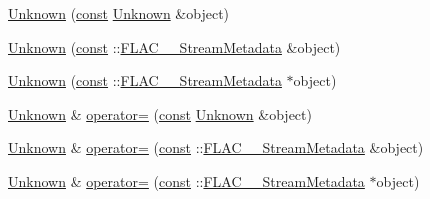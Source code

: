{\bf }\par
\begin{DoxyCompactItemize}
\item 
\hyperlink{class_f_l_a_c_1_1_metadata_1_1_unknown_a686a799c353cf7a3dc95bb8899318a6b}{Unknown} (\hyperlink{getopt1_8c_a2c212835823e3c54a8ab6d95c652660e}{const} \hyperlink{class_f_l_a_c_1_1_metadata_1_1_unknown}{Unknown} \&object)
\item 
\hyperlink{class_f_l_a_c_1_1_metadata_1_1_unknown_ad3e590e4c78eeda42021fe88b85bdf91}{Unknown} (\hyperlink{getopt1_8c_a2c212835823e3c54a8ab6d95c652660e}{const} \+::\hyperlink{struct_f_l_a_c_____stream_metadata}{F\+L\+A\+C\+\_\+\+\_\+\+Stream\+Metadata} \&object)
\item 
\hyperlink{class_f_l_a_c_1_1_metadata_1_1_unknown_a320c150b6c1c9b1386390eef1c581172}{Unknown} (\hyperlink{getopt1_8c_a2c212835823e3c54a8ab6d95c652660e}{const} \+::\hyperlink{struct_f_l_a_c_____stream_metadata}{F\+L\+A\+C\+\_\+\+\_\+\+Stream\+Metadata} $\ast$object)
\end{DoxyCompactItemize}

{\bf }\par
\begin{DoxyCompactItemize}
\item 
\hyperlink{class_f_l_a_c_1_1_metadata_1_1_unknown}{Unknown} \& \hyperlink{class_f_l_a_c_1_1_metadata_1_1_unknown_a295f824df8ed10c3386df72272fdca47}{operator=} (\hyperlink{getopt1_8c_a2c212835823e3c54a8ab6d95c652660e}{const} \hyperlink{class_f_l_a_c_1_1_metadata_1_1_unknown}{Unknown} \&object)
\item 
\hyperlink{class_f_l_a_c_1_1_metadata_1_1_unknown}{Unknown} \& \hyperlink{class_f_l_a_c_1_1_metadata_1_1_unknown_a5b51e8afe12e5359386d7a85ac330d6e}{operator=} (\hyperlink{getopt1_8c_a2c212835823e3c54a8ab6d95c652660e}{const} \+::\hyperlink{struct_f_l_a_c_____stream_metadata}{F\+L\+A\+C\+\_\+\+\_\+\+Stream\+Metadata} \&object)
\item 
\hyperlink{class_f_l_a_c_1_1_metadata_1_1_unknown}{Unknown} \& \hyperlink{class_f_l_a_c_1_1_metadata_1_1_unknown_ab0f5ba02518c5893fe93429292f62ef6}{operator=} (\hyperlink{getopt1_8c_a2c212835823e3c54a8ab6d95c652660e}{const} \+::\hyperlink{struct_f_l_a_c_____stream_metadata}{F\+L\+A\+C\+\_\+\+\_\+\+Stream\+Metadata} $\ast$object)
\end{DoxyCompactItemize}

